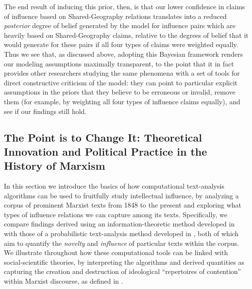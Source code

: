 \documentclass[11pt]{article}
\begin{document}
The end result of inducing this prior, then, is that our lower confidence in claims of influence based on \textsf{Shared-Geography} relations translates into a reduced \textit{posterior} degree of belief generated by the model for influence pairs which are heavily based on \textsf{Shared-Geography} claims, relative to the degrees of belief that it would generate for these pairs if all four types of claims were weighted equally. Thus we see that, as discussed above, adopting this Bayesian framework renders our modeling assumptions maximally transparent, to the point that it in fact provides other researchers studying the same phenomena with a set of tools for direct constructive criticism of the model: they can point to particular explicit assumptions in the priors that they believe to be erroneous or invalid, remove them (for example, by weighting all four types of influence claims equally), and see if our findings still hold.



\subsection{The Point is to Change It: Theoretical Innovation and Political Practice in the History of Marxism}\label{sec:history-of-marxism}

In this section we introduce the basics of how computational text-analysis algorithms can be used to fruitfully study intellectual influence, by analyzing a corpus of prominent Marxist texts from 1848 to the present and exploring what types of influence relations we can capture among its texts. Specifically, we compare findings derived using an information-theoretic method developed in \cite{barron_individuals_2018} with those of a probabilistic text-analysis method developed in \cite{gerow_measuring_2018}, both of which aim to quantify the \textit{novelty} and \textit{influence} of particular texts within the corpus. We illustrate throughout how these computational tools can be linked with social-scientific theories, by interpreting the algorithms and derived quantities as capturing the creation and destruction of ideological ``repertoires of contention'' within Marxist discourse, as defined in \cite{tilly_contentious_2008}.
\end{document}
